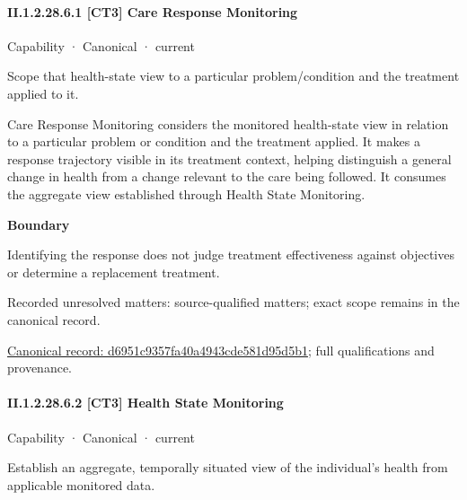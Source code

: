 \paragraph*{II.1.2.28.6.1 [CT3] Care Response Monitoring}
\label{navigation:II.1.2.28.6.1}

\label{element:d6951c9357fa40a4943cde581d95d5b1}
{\small Capability · Canonical · current}\par

Scope that health-state view to a particular problem/condition and the treatment applied to it.



Care Response Monitoring considers the monitored health-state view in relation to a particular problem or condition and the treatment applied. It makes a response trajectory visible in its treatment context, helping distinguish a general change in health from a change relevant to the care being followed. It consumes the aggregate view established through Health State Monitoring.



\textbf{Boundary}



Identifying the response does not judge treatment effectiveness against objectives or determine a replacement treatment.


{\small Recorded unresolved matters: source-qualified matters; exact scope remains in the canonical record.}\par
{\footnotesize \href{../../../../continuum/strategy/capability/d6951c9357fa40a4943cde581d95d5b1.md}{Canonical record: d6951c9357fa40a4943cde581d95d5b1}; full qualifications and provenance.}\par
\paragraph*{II.1.2.28.6.2 [CT3] Health State Monitoring}
\label{navigation:II.1.2.28.6.2}

\label{element:d77f22909f8b47dba4cbd95982e576df}
{\small Capability · Canonical · current}\par

Establish an aggregate, temporally situated view of the individual’s health from applicable monitored data.



